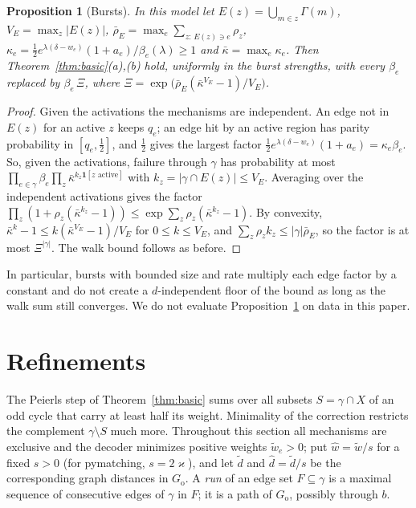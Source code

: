 \documentclass[11pt]{article}
\theoremstyle{plain}
\newtheorem{proposition}{Proposition}
\theoremstyle{definition}
\theoremstyle{remark}
\newcommand{\Go}{G_{\mathrm{o}}}
\newcommand{\tw}{\tilde w}
\newcommand{\hw}{\hat w}
\newcommand{\td}{\tilde d}
\newcommand{\hd}{\hat d}
\newcommand{\one}{\mathbf 1}
\renewcommand{\_}{\oldunderscore\allowbreak}
\begin{document}
\begin{proposition}[Bursts]\label{prop:bursts}
In this model let $E(z)=\bigcup_{m\in z}\Gamma(m)$, $V_E=\max_z|E(z)|$, $\bar\rho_E=\max_e\sum_{z:\,E(z)\ni e}\rho_z$, $\kappa_e=\tfrac12e^{\lambda(\delta-w_e)}(1+a_e)/\beta_e(\lambda)\ge1$ and $\bar\kappa=\max_e\kappa_e$. Then Theorem~\ref{thm:basic}(a),(b) hold, uniformly in the burst strengths, with every $\beta_e$ replaced by $\beta_e\,\Xi$, where $\Xi=\exp\big(\bar\rho_E(\bar\kappa^{V_E}-1)/V_E\big)$.
\end{proposition}
\begin{proof}
Given the activations the mechanisms are independent. An edge not in $E(z)$ for an active $z$ keeps $q_e$; an edge hit by an active region has parity probability in $[q_e,\tfrac12]$, and $\tfrac12$ gives the largest factor $\tfrac12e^{\lambda(\delta-w_e)}(1+a_e)=\kappa_e\beta_e$. So, given the activations, failure through $\gamma$ has probability at most $\prod_{e\in\gamma}\beta_e\prod_z\bar\kappa^{k_z\one[z\text{ active}]}$ with $k_z=|\gamma\cap E(z)|\le V_E$. Averaging over the independent activations gives the factor $\prod_z(1+\rho_z(\bar\kappa^{k_z}-1))\le\exp\sum_z\rho_z(\bar\kappa^{k_z}-1)$. By convexity, $\bar\kappa^{k}-1\le k(\bar\kappa^{V_E}-1)/V_E$ for $0\le k\le V_E$, and $\sum_z\rho_zk_z\le|\gamma|\bar\rho_E$, so the factor is at most $\Xi^{|\gamma|}$. The walk bound follows as before.
\end{proof}

\noindent In particular, bursts with bounded size and rate multiply each edge factor by a constant and do not create a $d$-independent floor of the bound as long as the walk sum still converges. We do not evaluate Proposition~\ref{prop:bursts} on data in this paper.

\section{Refinements}\label{sec:refinements}

The Peierls step of Theorem~\ref{thm:basic} sums over all subsets $S=\gamma\cap X$ of an odd cycle that carry at least half its weight. Minimality of the correction restricts the complement $\gamma\setminus S$ much more. Throughout this section all mechanisms are exclusive and the decoder minimizes positive weights $\tw_e>0$; put $\hw=\tw/s$ for a fixed $s>0$ (for pymatching, $s=2\varkappa$), and let $\td$ and $\hd=\td/s$ be the corresponding graph distances in $\Go$. A \emph{run} of an edge set $F\subseteq\gamma$ is a maximal sequence of consecutive edges of $\gamma$ in $F$; it is a path of $\Go$, possibly through $b$.
\end{document}
